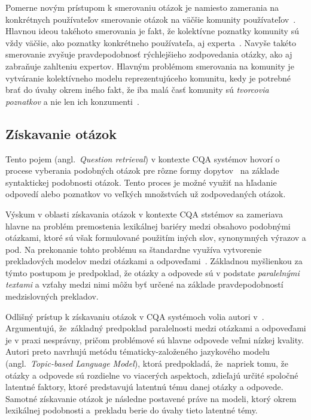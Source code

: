 Pomerne novým prístupom k smerovaniu otázok je namiesto zamerania na konkrétnych používateľov smerovanie otázok na väčšie
komunity používateľov~\cite{Liu2014}. Hlavnou ideou takéhoto smerovania je fakt, že kolektívne poznatky komunity sú vždy väčšie, ako
poznatky konkrétneho používateľa, aj experta~\cite{Pal2013}. Navyše takéto smerovanie zvyšuje pravdepodobnosť rýchlejšieho zodpovedania
otázky, ako aj zabraňuje zahlteniu expertov. Hlavným problémom smerovania na komunity je vytváranie kolektívneho modelu
reprezentujúceho komunitu, kedy je potrebné brať do úvahy okrem iného fakt, že iba malá časť komunity sú \emph{tvorcovia
poznatkov} a nie len ich konzumenti~\cite{Pal2015}.


\subsection{Získavanie otázok}\label{q:retr}

Tento pojem (angl.~\emph{Question retrieval}) v kontexte CQA systémov hovorí o procese vyberania podobných otázok pre
rôzne formy dopytov~\cite{Zhang2014} na základe syntaktickej podobnosti otázok.
Tento proces je možné využiť na hľadanie odpovedí alebo poznatkov vo veľkých množstvách už zodpovedaných otázok.

Výskum v oblasti získavania otázok v kontexte CQA ststémov sa zameriava hlavne na problém premostenia lexikálnej bariéry medzi
obsahovo podobnými otázkami, ktoré sú však formulované použitím iných slov, synonymných výrazov a pod. Na prekonanie
tohto problému sa štandardne využíva vytvorenie prekladových modelov medzi otázkami a odpoveďami~\cite{Cao2010}.
Základnou myšlienkou za týmto postupom je predpoklad, že otázky a odpovede sú v podstate \emph{paralelnými textami}
a vzťahy medzi nimi môžu byť určené na základe pravdepodobností medzislovných prekladov.

Odlišný prístup k získavaniu otázok v CQA systémoch volia autori v~\cite{Zhang2014}. Argumentujú, že~základný predpoklad
paralelnosti medzi otázkami a odpoveďami je v praxi nesprávny, pričom problémové sú hlavne odpovede veľmi nízkej kvality.
Autori preto navrhujú metódu tématicky-založeného jazykového modelu (angl.~\emph{Topic-based Language Model}), ktorá
predpokladá, že~napriek tomu, že otázky a odpovede sú rozdielne vo viacerých aspektoch, zdieľajú určité
spoločné latentné faktory, ktoré predstavujú latentnú tému danej otázky a odpovede. Samotné získavanie otázok je následne
postavené práve na modeli, ktorý okrem lexikálnej podobnosti a~prekladu berie do úvahy tieto latentné témy.


